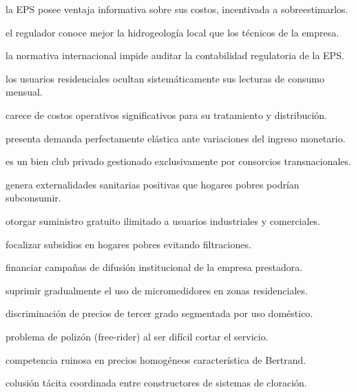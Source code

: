 \begin{opts}
    \item la EPS posee ventaja informativa sobre sus costos, incentivada a sobreestimarlos.
    \item el regulador conoce mejor la hidrogeología local que los técnicos de la empresa.
    \item la normativa internacional impide auditar la contabilidad regulatoria de la EPS.
    \item los usuarios residenciales ocultan sistemáticamente sus lecturas de consumo mensual.
\end{opts}

\begin{opts}
    \item carece de costos operativos significativos para su tratamiento y distribución.
    \item presenta demanda perfectamente elástica ante variaciones del ingreso monetario.
    \item es un bien club privado gestionado exclusivamente por consorcios transnacionales.
    \item genera externalidades sanitarias positivas que hogares pobres podrían subconsumir.
\end{opts}

\begin{opts}
    \item otorgar suministro gratuito ilimitado a usuarios industriales y comerciales.
    \item focalizar subsidios en hogares pobres evitando filtraciones.
    \item financiar campañas de difusión institucional de la empresa prestadora.
    \item suprimir gradualmente el uso de micromedidores en zonas residenciales.
\end{opts}

\begin{opts}
    \item discriminación de precios de tercer grado segmentada por uso doméstico.
    \item problema de polizón (free-rider) al ser difícil cortar el servicio.
    \item competencia ruinosa en precios homogéneos característica de Bertrand.
    \item colusión tácita coordinada entre constructores de sistemas de cloración.
\end{opts}

